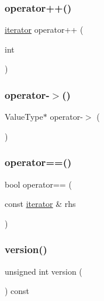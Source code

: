 \subsubsection{\texorpdfstring{operator++()}{operator++()}\hspace{0.1cm}{\footnotesize\ttfamily [2/2]}}
{\footnotesize\ttfamily \mbox{\hyperlink{classGrid_1_1iterator}{iterator}} operator++ (\begin{DoxyParamCaption}\item[{int}]{ }\end{DoxyParamCaption})\hspace{0.3cm}{\ttfamily [inline]}}

\mbox{\label{classGrid_1_1iterator_a5ba42337ec7bae549bb135838933b0ea}} 
\subsubsection{\texorpdfstring{operator-\/$>$()}{operator->()}}
{\footnotesize\ttfamily Value\+Type$\ast$ operator-\/$>$ (\begin{DoxyParamCaption}{ }\end{DoxyParamCaption})\hspace{0.3cm}{\ttfamily [inline]}}

\mbox{\label{classGrid_1_1iterator_a798956e7a65ef16c891d129b3ced0f9e}} 
\subsubsection{\texorpdfstring{operator==()}{operator==()}}
{\footnotesize\ttfamily bool operator== (\begin{DoxyParamCaption}\item[{const \mbox{\hyperlink{classGrid_1_1iterator}{iterator}} \&}]{rhs }\end{DoxyParamCaption})\hspace{0.3cm}{\ttfamily [inline]}}

\mbox{\label{classGrid_1_1iterator_a0aa696ccb72cbf928535d6b646bac1aa}} 
\subsubsection{\texorpdfstring{version()}{version()}}
{\footnotesize\ttfamily unsigned int version (\begin{DoxyParamCaption}{ }\end{DoxyParamCaption}) const\hspace{0.3cm}{\ttfamily [inline]}}

